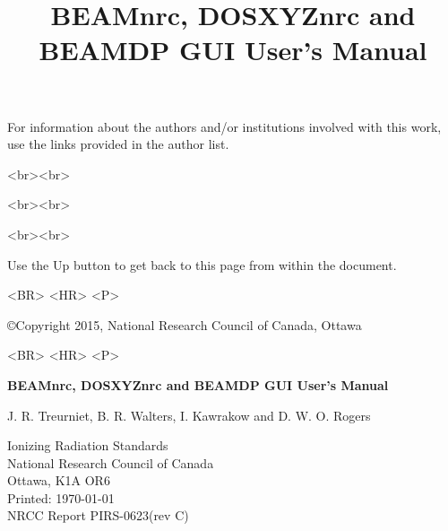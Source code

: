 \documentclass[12pt,twoside]{article}
\begin{document}
\begin{htmlonly}
For information about the authors and/or institutions involved with this
work, use the links provided in the author list.\\
\begin{rawhtml}
<br><br>
\end{rawhtml}
\begin{rawhtml}
<br><br>
\end{rawhtml}
\begin{rawhtml}
<br><br>
\end{rawhtml}

Use the Up button to get back to this page from within the document.
\begin{rawhtml}
<BR> <HR> <P>
\end{rawhtml}
\copyright Copyright 2015, National Research Council of Canada, Ottawa
\begin{rawhtml}
<BR> <HR> <P>
\end{rawhtml}
\end{htmlonly}

\pagestyle{empty}

\title{BEAMnrc, DOSXYZnrc and BEAMDP GUI User's Manual}
\begin{center}
{\sffamily \bfseries \Huge BEAMnrc, DOSXYZnrc and BEAMDP GUI User's Manual \vspace{5mm}\\}
\begin{large}
J. R. Treurniet, B. R. Walters, I. Kawrakow and D. W. O. Rogers\\
\end{large}
Ionizing Radiation Standards\\
National Research Council of Canada\\Ottawa, K1A OR6\\

Printed: \today  \\
\hfill NRCC Report {\sf PIRS-0623(rev C)}\\

\end{center}

\vskip 0.8in
\end{document}
